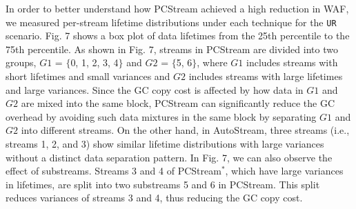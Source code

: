 In order to better understand how \textsf{\small PCStream} achieved a high reduction in WAF, 
we measured per-stream lifetime distributions under each technique for the \texttt{UR} scenario.
Fig. 7 shows a box plot of data lifetimes from the 25th percentile to the 75th percentile.
As shown in Fig. 7, 
streams in \textsf{\small PCStream} are divided into two groups, 
$G1$ = $\{$0, 1, 2, 3, 4$\}$ and $G2$ = $\{$5, 6$\}$, 
where $G1$ includes streams with short lifetimes and small variances %
and $G2$ includes streams with large lifetimes and large variances.  %
Since the GC copy cost is affected by how data in $G1$ and $G2$ are mixed into the same block, 
\textsf{\small PCStream} can significantly reduce the GC overhead 
by avoiding such data mixtures in the same block by separating $G1$ and $G2$ into different streams. 
On the other hand, in \textsf{\small AutoStream}, 
three streams (i.e., streams 1, 2, and 3) show similar lifetime distributions with large variances 
without a distinct data separation pattern.
In Fig. 7, we can also observe the effect of substreams.  
Streams 3 and 4 of \textsf{\small PCStream$^{*}$}, 
which have large variances in lifetimes, are split into two substreams 5 and 6 in \textsf{\small PCStream}.
This split reduces variances of streams 3 and 4, thus reducing the GC copy cost.  %

